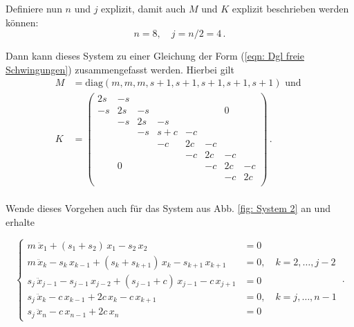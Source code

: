 \documentclass[a4paper,12pt]{report}
\newcommand{\diag}{\text{diag}}
\newcommand{\1}{\mathds{1}}
\theoremstyle{plain} %
\theoremstyle{definition} %
\theoremstyle{remark}
\begin{document}
            Definiere nun $n$ und $j$ explizit, damit auch $M$ und $K$ explizit beschrieben werden können:
            \begin{equation}
                  \label{def: nUndJ explizit}
                  n=8,\quad j=n/2=4\,.
            \end{equation}

            Dann kann dieses System zu einer Gleichung der Form (\ref{eqn: Dgl freie Schwingungen}) zusammengefasst werden.
            Hierbei gilt
            \begin{align}
                  M &= \diag(m, m, m, s+1, s+1,s+1, s+1,  s+1)\text{ und }\label{def: M1}\\
                  K &= \begin{pmatrix}
                        2s & -s &  &  &  &  &  &  \\
                        -s &  2s& -s &  &  &  &0  &  \\
                         & -s & 2s & -s &  &  &  &  \\
                         &  & -s & s+c & -c &  &  &  \\
                         &  &  & -c & 2c & -c &  &  \\
                         &  &  &  & -c & 2c & -c &  \\
                         & 0 &  &  &  & -c & 2c &  -c\\
                         &  &  &  &  &  & -c & 2c \\
                        \end{pmatrix}\,.\label{def: K1}
            \end{align}\\

            Wende dieses Vorgehen auch für das System aus Abb. \ref{fig: System 2} an und erhalte
            
            $$\begin{cases}
                  m\ \ddot x_1 + (s_1+s_2)\,x_1 - s_2\,x_2 & = 0   \\
                  m\,\ddot x_k -s_k\,x_{k-1} + (s_k+s_{k+1})\,x_k -s_{k+1}\,x_{k+1} & = 0,\quad k=2,\dots,j-2\\
                  s_j\,\ddot x_{j-1} -s_{j-1}\,x_{j-2} + (s_{j-1}+c)\,x_{j-1} -c\,x_{j+1} & = 0\\
                  s_j\,\ddot x_k -c\,x_{k-1} + 2c\,x_k -c\,x_{k+1} & = 0,\quad k=j,\dots,n-1\\
                  s_j\,\ddot x_n -c\,x_{n-1}+ 2c\,x_n & = 0
            \end{cases}\,.$$
            
\end{document}
